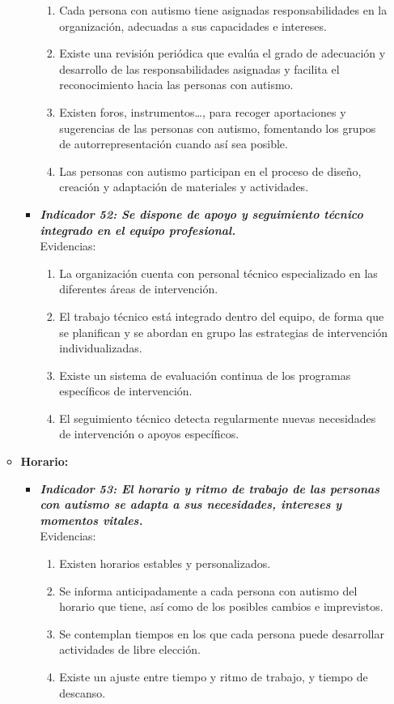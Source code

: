 \begin{itemize}
\begin{itemize}
\begin{itemize}
			\begin{enumerate}
				\item Cada persona con autismo tiene asignadas responsabilidades en la organización, adecuadas a sus capacidades e intereses. 
				\item Existe una revisión periódica que evalúa el grado de adecuación y desarrollo de las responsabilidades asignadas y facilita el reconocimiento hacia las personas con autismo. 
				\item Existen foros, instrumentos…, para recoger aportaciones y sugerencias de las personas con autismo, fomentando los grupos de autorrepresentación cuando así sea posible. 
				\item Las personas con autismo participan en el proceso de diseño, creación y adaptación de materiales y actividades. 
				 
			\end{enumerate}

			\item \textbf{\textit{Indicador 52: Se dispone de apoyo y seguimiento técnico integrado en el equipo profesional.}}\\Evidencias:
			
			\begin{enumerate}
				\item La organización cuenta con personal técnico especializado en las diferentes áreas de intervención. 
				\item El trabajo técnico está integrado dentro del equipo, de forma que se planifican y se abordan en grupo las estrategias de intervención individualizadas. 
				\item Existe un sistema de evaluación continua de los programas específicos de intervención. 
				\item El seguimiento técnico detecta regularmente nuevas necesidades de intervención o apoyos específicos. 
				
			\end{enumerate}
		\end{itemize}

		\item \textbf{Horario:}
		\begin{itemize}
			\item \textbf{\textit{Indicador 53: El horario y ritmo de trabajo de las personas con autismo se adapta a sus necesidades, intereses y momentos vitales.}}\\Evidencias:
			
			\begin{enumerate}
				\item Existen horarios estables y personalizados. 
				\item Se informa anticipadamente a cada persona con autismo del horario que tiene, así como de los posibles cambios e imprevistos. 
				\item Se contemplan tiempos en los que cada persona puede desarrollar actividades de libre elección. 
				\item Existe un ajuste entre tiempo y ritmo de trabajo, y tiempo de descanso. 
				 

\end{enumerate}
\end{itemize}
\end{itemize}
\end{itemize}
